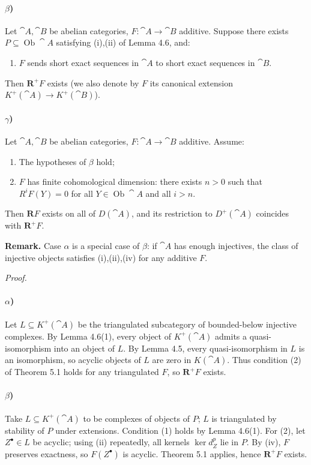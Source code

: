\setcounter{page}{57}
\paragraph{$\beta$)}
Let \(\cat{A},\cat{B}\) be abelian categories, \(F\colon\cat{A}\to\cat{B}\) additive. Suppose there exists \(P\subseteq\operatorname{Ob}\cat{A}\) satisfying (i),(ii) of Lemma 4.6, and:
\begin{enumerate}
\item[(iv)] \(F\) sends short exact sequences in \(\cat{A}\) to short exact sequences in \(\cat{B}\).
\end{enumerate}
Then \(\mathbf{R}^+F\) exists (we also denote by \(F\) its canonical extension \(K^+(\cat{A})\to K^+(\cat{B})\)).

\paragraph{$\gamma$)}
Let \(\cat{A},\cat{B}\) be abelian categories, \(F\colon\cat{A}\to\cat{B}\) additive. Assume:
\begin{enumerate}
\item[(a)] The hypotheses of \(\beta\) hold;
\item[(b)] \(F\) has finite cohomological dimension: there exists \(n>0\) such that \(R^iF(Y)=0\) for all \(Y\in\operatorname{Ob}\cat{A}\) and all \(i>n\).
\end{enumerate}
Then \(\mathbf{R}F\) exists on all of \(D(\cat{A})\), and its restriction to \(D^+(\cat{A})\) coincides with \(\mathbf{R}^+F\).

\medskip
\textbf{Remark.} Case \(\alpha\) is a special case of \(\beta\): if \(\cat{A}\) has enough injectives, the class of injective objects satisfies (i),(ii),(iv) for any additive \(F\).

\setcounter{page}{58}
\textit{Proof.}
\paragraph{$\alpha$)}
Let \(L\subseteq K^+(\cat{A})\) be the triangulated subcategory of bounded-below injective complexes. By Lemma 4.6(1), every object of \(K^+(\cat{A})\) admits a quasi-isomorphism into an object of \(L\). By Lemma 4.5, every quasi-isomorphism in \(L\) is an isomorphism, so acyclic objects of \(L\) are zero in \(K(\cat{A})\). Thus condition (2) of Theorem 5.1 holds for any triangulated \(F\), so \(\mathbf{R}^+F\) exists.

\paragraph{$\beta$)}
Take \(L\subseteq K^+(\cat{A})\) to be complexes of objects of \(P\); \(L\) is triangulated by stability of \(P\) under extensions. Condition (1) holds by Lemma 4.6(1). For (2), let \(Z^\bullet\in L\) be acyclic; using (ii) repeatedly, all kernels \(\ker d_Z^p\) lie in \(P\). By (iv), \(F\) preserves exactness, so \(F(Z^\bullet)\) is acyclic. Theorem 5.1 applies, hence \(\mathbf{R}^+F\) exists.

